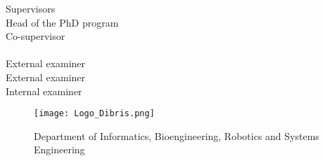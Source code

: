 \vfill


	 \hfill  {Supervisors}	
	\\
		\hfill  {Head of the PhD program}	
	\\
	 \hfill  {Co-supervisor}	
	\vspace{1em} \\
	\\
		\hfill  {External examiner}	
	\\
		\hfill  {External examiner}
	\\
			 \hfill  {Internal examiner}

\vspace{1em}
\vfill
\begin{figure}[h!]
 \centering
 \texttt{[image: Logo\_Dibris.png]}
\begin{center} 
		\small{Department of Informatics, Bioengineering, Robotics and Systems Engineering\\}
	\end{center}
\end{figure}
	


